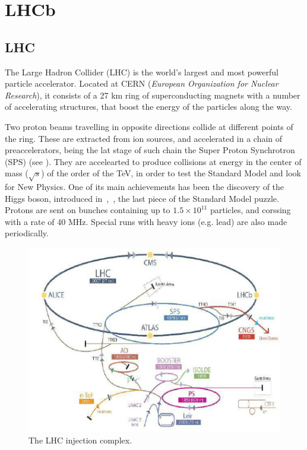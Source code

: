 \chapter{LHCb}
\label{chap:LHCb}

\section{LHC}
\label{sec:LHC}
The Large Hadron Collider (LHC) is the world's largest and most powerful particle accelerator. Located at CERN (\textit{European Organization for Nuclear Research}), it consists of a 27 km ring of superconducting magnets with a number of accelerating structures, that boost the energy of the particles along the way. 

Two proton beams travelling in opposite directions collide at different points of the ring. These are extracted from ion sources, and accelerated in a chain of preaccelerators, being the lat stage of such chain the Super Proton Synchrotron (SPS) (see ). 
They are accelearted to produce collisions at energy in the center of mass ($\sqrt{s}$) of the order of the TeV, in order to test the Standard Model and look for New Physics. One of its main achievements has been the discovery of the Higgs boson, introduced in~\cite{Chatrchyan:2012xdj},~\cite{Aad:2012tfa}, the last piece of the Standard Model puzzle. Protons are sent on bunches containing up to $1.5\times 10^{11}$ particles, and corssing with a rate of 40 MHz. Special runs with heavy ions (e.g. lead) are also made periodically. 
\begin{figure} [htb!]
\begin{center}
\includegraphics[scale=0.5]{figs/lhc.png}
\caption{The LHC injection complex. \label{fig:LHC}}
\end{center}
\end{figure}

